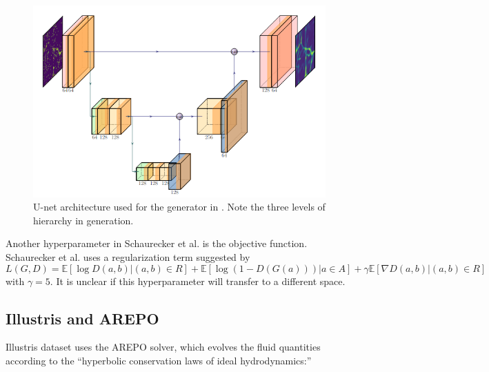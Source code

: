 \begin{figure}[h!]
  \includegraphics[width=\textwidth]{unet.png}
  \caption{U-net architecture used for the generator in \cite{superresolving-halos}. Note the three levels of hierarchy in generation.}
  \label{unet}
\end{figure}

Another hyperparameter in Schaurecker et al. is the objective function. Schaurecker et al. uses a regularization term suggested by \cite{GAN-regularization}
\[L(G, D) = \mathbb E [\log D(a, b) | (a, b) \in R] + \mathbb E [\log(1 - D(G(a))) | a \in A] + \gamma \mathbb E [\nabla D(a, b) | (a, b) \in R]\]
with \(\gamma = 5\). It is unclear if this hyperparameter will transfer to a different space.

\subsection*{Illustris and \textsc{AREPO}}

Illustris dataset\cite{nelson_illustris_2015,vogelsberger_introducing_2014} uses the \textsc{AREPO} solver, which evolves the fluid quantities according to the ``hyperbolic conservation laws of ideal hydrodynamics:''\cite{springel_e_2010}


